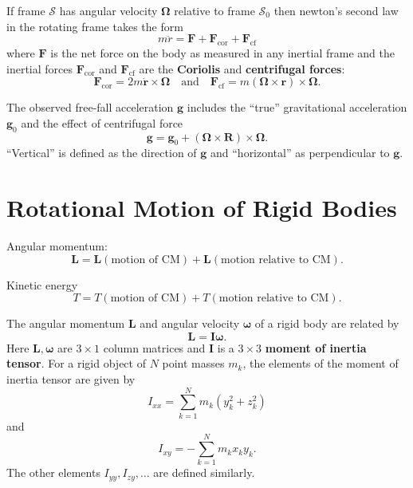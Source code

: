 \documentclass{book}
\theoremstyle{definition}
\begin{document}
If frame $\mathcal{S}$ has angular velocity $\mathbf{\Omega}$ relative to frame $\mathcal{S}_0$ then newton's second law in the rotating frame takes the form 
\begin{equation*}
m\ddot{r} = \mathbf{F} + \mathbf{F}_\text{cor} + \mathbf{F}_\text{cf}
\end{equation*}
where $\mathbf{F}$ is the net force on the body as measured in any inertial frame and the inertial forces $\mathbf{F}_\text{cor}$ and $\mathbf{F}_\text{cf}$ are the \textbf{Coriolis} and \textbf{centrifugal forces}:
\begin{equation*}
\mathbf{F}_\text{cor} = 2m \dot{\textbf{r}} \times \mathbf{\Omega} \quad \text{and} \quad \textbf{F}_\text{cf} = m(\mathbf{\Omega}\times \textbf{r})\times \mathbf{\Omega}.
\end{equation*}

The observed free-fall acceleration $\textbf{g}$ includes the ``true'' gravitational acceleration $\textbf{g}_0$ and the effect of centrifugal force
\begin{equation*}
\textbf{g} = \textbf{g}_0 + (\mathbf{\Omega} \times \mathbf{R})\times \mathbf{\Omega}.
\end{equation*} 
``Vertical'' is defined as the direction of $\textbf{g}$ and ``horizontal'' as perpendicular to $\textbf{g}$. 



\section{Rotational Motion of Rigid Bodies}


Angular momentum:
\begin{equation*}
\textbf{L} = \textbf{L}(\text{motion of CM}) + \mathbf{L}(\text{motion relative to CM}).
\end{equation*}

Kinetic energy
\begin{equation*}
T = T(\text{motion of CM}) + T(\text{motion relative to CM}).
\end{equation*}

The angular momentum $\mathbf{L}$ and angular velocity ${\mathbf{\omega}}$ of a rigid body are related by 
\begin{equation*}
\mathbf{L} = \mathbf{I} \mathbf{\omega}.
\end{equation*}
Here $\mathbf{L}, \mathbf{\omega}$ are $3\times 1$ column matrices and $\mathbf{I}$ is a $3\times 3$ \textbf{moment of inertia tensor}. For a rigid object of $N$ point masses $m_k$, the elements of the moment of inertia tensor are given by 
\begin{equation*}
I_{xx} = \sum_{k=1}^N m_k (y^2_k + z^2_k)
\end{equation*}
and 
\begin{equation*}
I_{xy} = -\sum_{k=1}^N m_k  x_k y_k.
\end{equation*}
The other elements $I_{yy}, I_{zy}, \dots$ are defined similarly. \\
\end{document}
